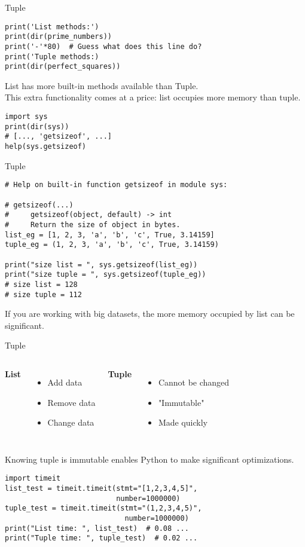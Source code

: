 \documentclass{beamer}
\begin{document}
\begin{frame}[fragile]{Tuple}
\begin{verbatim}
print('List methods:')
print(dir(prime_numbers))
print('-'*80)  # Guess what does this line do?
print('Tuple methods:)
print(dir(perfect_squares))
\end{verbatim}
List has more built-in methods available than Tuple.\\
This extra functionality comes at a price: list occupies more
memory than tuple.
\begin{verbatim}
import sys
print(dir(sys))
# [..., 'getsizeof', ...]
help(sys.getsizeof)
\end{verbatim}
\end{frame}

\begin{frame}[fragile]{Tuple}
\begin{verbatim}
# Help on built-in function getsizeof in module sys:

# getsizeof(...)
#     getsizeof(object, default) -> int
#     Return the size of object in bytes.
list_eg = [1, 2, 3, 'a', 'b', 'c', True, 3.14159]
tuple_eg = (1, 2, 3, 'a', 'b', 'c', True, 3.14159)

print("size list = ", sys.getsizeof(list_eg))
print("size tuple = ", sys.getsizeof(tuple_eg))
# size list = 128
# size tuple = 112
\end{verbatim}
If you are working with big datasets, the more memory 
occupied by list can be significant.
\end{frame}

\begin{frame}[fragile]{Tuple}
\begin{columns}[T]
\textbf{List}
\begin{itemize}
\item Add data
\item Remove data
\item Change data
\end{itemize}
\textbf{Tuple}
\begin{itemize}
\item Cannot be changed
\item "Immutable"
\item Made quickly
\end{itemize}
\end{columns}
\vspace{10pt}
Knowing tuple is immutable enables Python to make 
significant optimizations.
\begin{verbatim}
import timeit
list_test = timeit.timeit(stmt="[1,2,3,4,5]", 
                          number=1000000)
tuple_test = timeit.timeit(stmt="(1,2,3,4,5)",
                            number=1000000)
print("List time: ", list_test)  # 0.08 ...
print("Tuple time: ", tuple_test)  # 0.02 ...
\end{verbatim}
\end{frame}
\end{document}
